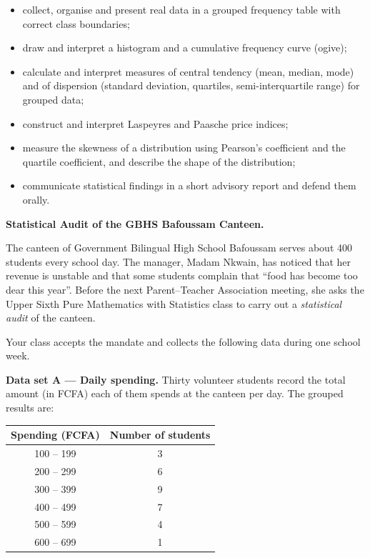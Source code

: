 \documentclass[11pt]{article}
\newcommand{\cle}[1]{{\popxbold\color{popdark}#1}}
\newcounter{popsec}
\newcounter{popsub}
\newcommand{\courssub}[1]{%
  \stepcounter{popsub}%
  \par\vspace{9pt}\noindent{\popxbold\fontsize{11.5}{13}\selectfont\color{popink}{\color{poporange}\thepopsec.\thepopsub}\hspace{6pt}#1}\par\nopagebreak\vspace{4pt}
}
\begin{document}
\begin{itemize}
\item collect, organise and present real data in a \cle{grouped frequency table} with correct \cle{class boundaries};
\item draw and interpret a \cle{histogram} and a \cle{cumulative frequency curve} (ogive);
\item calculate and interpret measures of \cle{central tendency} (mean, median, mode) and of \cle{dispersion} (standard deviation, quartiles, semi-interquartile range) for grouped data;
\item construct and interpret \cle{Laspeyres} and \cle{Paasche} price indices;
\item measure the \cle{skewness} of a distribution using Pearson's coefficient and the quartile coefficient, and describe the shape of the distribution;
\item communicate statistical findings in a short advisory report and defend them orally.
\end{itemize}

\courssub{Situation}

\textbf{Statistical Audit of the GBHS Bafoussam Canteen.}\par\medskip

The canteen of Government Bilingual High School Bafoussam serves about 400 students every school day. The manager, Madam Nkwain, has noticed that her revenue is unstable and that some students complain that ``food has become too dear this year''. Before the next Parent--Teacher Association meeting, she asks the Upper Sixth Pure Mathematics with Statistics class to carry out a \emph{statistical audit} of the canteen.

Your class accepts the mandate and collects the following data during one school week.

\textbf{Data set A — Daily spending.} Thirty volunteer students record the total amount (in FCFA) each of them spends at the canteen per day. The grouped results are:

\begin{center}
\begin{tabular}{|c|c|}
\hline
\rowcolor{popblueL} Spending (FCFA) & Number of students \\
\hline
100 -- 199 & 3 \\
\hline
200 -- 299 & 6 \\
\hline
300 -- 399 & 9 \\
\hline
400 -- 499 & 7 \\
\hline
500 -- 599 & 4 \\
\hline
600 -- 699 & 1 \\
\hline
\end{tabular}
\end{center}
\end{document}
